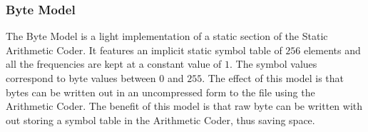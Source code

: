 \documentclass[a4paper,11pt]{report}
\begin{document}

\subsubsection{Byte Model}

The Byte Model is a light implementation of a static section of the Static Arithmetic Coder. It features an implicit static symbol table of $256$ elements and all the frequencies are kept at a constant value of $1$. The symbol values correspond to byte values between $0$ and $255$. The effect of this model is that bytes can be written out in an uncompressed form to the file using the Arithmetic Coder. The benefit of this model is that raw byte can be written with out storing a symbol table in the Arithmetic Coder, thus saving space. 
\end{document}
